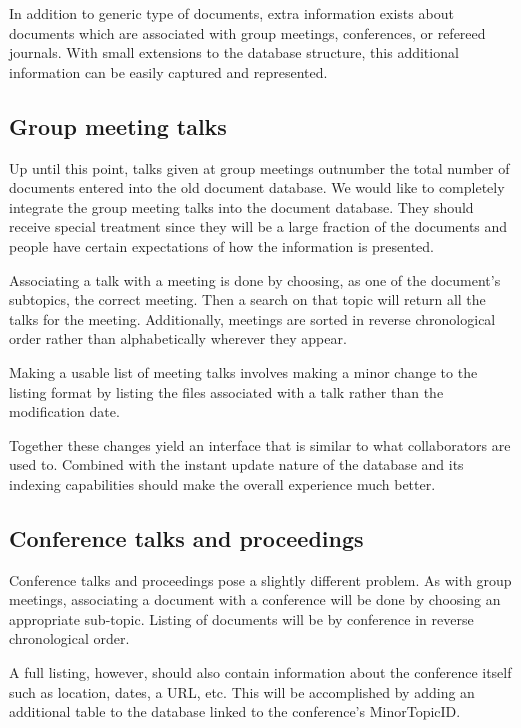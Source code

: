 \documentclass[12pt]{article}
\begin{document}
In addition to generic type of documents, extra information exists about
documents which are associated with group meetings, conferences, or refereed
journals. With small extensions to the database structure, this additional
information can be easily captured and represented.

\subsection{Group meeting talks}

Up until this point, talks given at group meetings outnumber the total number
of documents entered into the old document database. We would like to
completely integrate the group meeting talks into the document database. They
should receive special treatment since they will be a large fraction of the
documents and people have certain expectations of how the information is
presented.

Associating a talk with a meeting is done by choosing, as one of the document's
subtopics, the correct meeting. Then a search on that topic will return all the
talks for the meeting. Additionally, meetings are sorted in reverse
chronological order rather than alphabetically wherever they appear.

Making a usable list of meeting talks involves making a minor change to the
listing format by listing the files associated with a talk rather than the
modification date. 

Together these changes yield an interface that is similar to what collaborators
are used to. Combined with the instant update nature of the database and its
indexing capabilities should make the overall experience much better.

\subsection{Conference talks and proceedings}

Conference talks and proceedings pose a slightly different problem. As with
group meetings, associating a document with a conference will be done by
choosing an appropriate sub-topic. Listing of documents will be by conference
in reverse chronological order. 

A full listing, however, should also contain information about the conference
itself such as location, dates, a URL, etc. This will be accomplished by adding
an additional table to the database linked to the conference's MinorTopicID.
\end{document}

